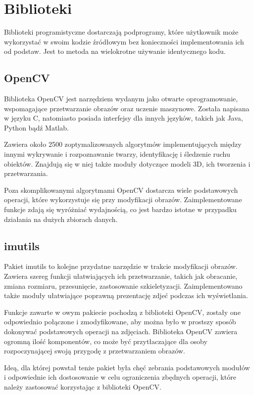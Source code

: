 \section{Biblioteki}
Biblioteki programistyczne dostarczają podprogramy, które użytkownik może wykorzystać w swoim kodzie źródłowym bez konieczności implementowania ich od podstaw. Jest to metoda na wielokrotne używanie identycznego kodu.

\subsection{OpenCV}
Biblioteka OpenCV \cite{opencv} jest narzędziem wydanym jako otwarte oprogramowanie, wspomagające przetwarzanie obrazów oraz uczenie maszynowe. Została napisana w języku C, natomiasto posiada interfejsy dla innych języków, takich jak Java, Python bądź Matlab.

Zawiera około 2500 zoptymalizowanych algorytmów implementujących między innymi wykrywanie i rozpoznawanie twarzy, identyfikację i śledzenie ruchu obiektów. Znajdują się w niej także moduły dotyczące modeli 3D, ich tworzenia i przetwarzania.

Poza skomplikowanymi algorytmami OpenCV dostarcza wiele podstawowych operacji, które wykorzystuje się przy modyfikacji obrazów. Zaimplementowane funkcje zdają się wyróżniać wydajnością, co jest bardzo istotne w przypadku działania na dużych zbiorach danych.

\subsection{imutils}
Pakiet imutils \cite{imutils} to kolejne przydatne narzędzie w trakcie modyfikacji obrazów. Zawiera szereg funkcji ułatwiających ich przetwarzanie, takich jak obracanie, zmiana rozmiaru, przesunięcie, zastosowanie szkieletyzacji. Zaimplementowano także moduły ułatwiające poprawną prezentację zdjeć podczas ich wyświetlania.

Funkcje zawarte w owym pakiecie pochodzą z biblioteki OpenCV, zostały one odpowiednio połączone i zmodyfikowane, aby można było w prostszy sposób dokonywać podstawowych operacji na zdjęciach. Biblioteka OpenCV zawiera ogromną ilość komponentów, co może być przytłaczające dla osoby rozpoczynającej swoją przygodę z przetwarzaniem obrazów.

Ideą, dla której powstał tenże pakiet była chęć zebrania podstawowych modułów i odpowiednie ich dostosowanie w celu ograniczenia zbędnych operacji, które należy zastosować korzystając z biblioteki OpenCV.

